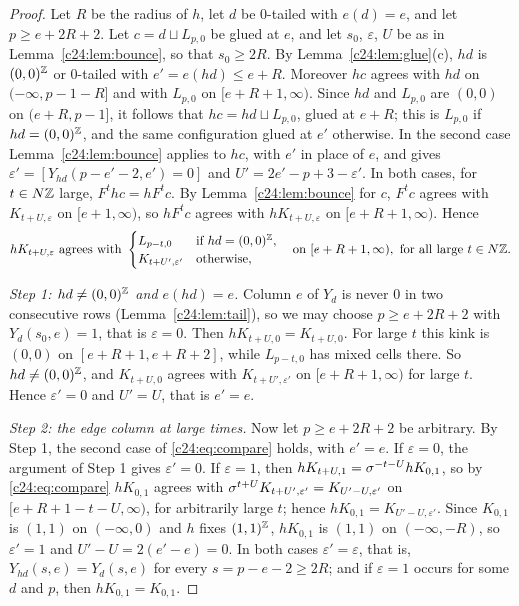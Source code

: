 \begin{proof}
Let $R$ be the radius of $h$, let $d$ be $0$-tailed with $e(d)=e$, and let $p\ge e+2R+2$. Let $c=d\sqcup L_{p,0}$ be glued at $e$, and let $s_0$, $\varepsilon$, $U$ be as in Lemma~\ref{c24:lem:bounce}, so that $s_0\ge 2R$. By Lemma~\ref{c24:lem:glue}(c), $hd$ is $(0,0)^{\mathbb{Z}}$ or $0$-tailed with $e'=e(hd)\le e+R$. Moreover $hc$ agrees with $hd$ on $(-\infty,p-1-R]$ and with $L_{p,0}$ on $[e+R+1,\infty)$. Since $hd$ and $L_{p,0}$ are $(0,0)$ on $(e+R,p-1]$, it follows that $hc=hd\sqcup L_{p,0}$, glued at $e+R$; this is $L_{p,0}$ if $hd=(0,0)^{\mathbb{Z}}$, and the same configuration glued at $e'$ otherwise. In the second case Lemma~\ref{c24:lem:bounce} applies to $hc$, with $e'$ in place of $e$, and gives $\varepsilon'=[Y_{hd}(p-e'-2,e')=0]$ and $U'=2e'-p+3-\varepsilon'$. In both cases, for $t\in N\mathbb{Z}$ large, $F^thc=hF^tc$. By Lemma~\ref{c24:lem:bounce} for $c$, $F^tc$ agrees with $K_{t+U,\varepsilon}$ on $[e+1,\infty)$, so $hF^tc$ agrees with $hK_{t+U,\varepsilon}$ on $[e+R+1,\infty)$. Hence
\begin{equation}\label{c24:eq:compare}
hK_{t+U,\varepsilon}\ \text{agrees with}\ \begin{cases}L_{p-t,0}&\text{if }hd=(0,0)^{\Z},\\ K_{t+U',\varepsilon'}&\text{otherwise,}\end{cases}\quad\text{on }[e+R+1,\infty),\text{ for all large }t\in N\Z.
\end{equation}

\emph{Step 1: $hd\ne(0,0)^{\mathbb{Z}}$ and $e(hd)=e$.} Column $e$ of $Y_d$ is never $0$ in two consecutive rows (Lemma~\ref{c24:lem:tail}), so we may choose $p\ge e+2R+2$ with $Y_d(s_0,e)=1$, that is $\varepsilon=0$. Then $hK_{t+U,0}=K_{t+U,0}$. For large $t$ this kink is $(0,0)$ on $[e+R+1,e+R+2]$, while $L_{p-t,0}$ has mixed cells there. So $hd\ne(0,0)^{\mathbb{Z}}$, and $K_{t+U,0}$ agrees with $K_{t+U',\varepsilon'}$ on $[e+R+1,\infty)$ for large $t$. Hence $\varepsilon'=0$ and $U'=U$, that is $e'=e$.

\emph{Step 2: the edge column at large times.} Now let $p\ge e+2R+2$ be arbitrary. By Step 1, the second case of \eqref{c24:eq:compare} holds, with $e'=e$. If $\varepsilon=0$, the argument of Step 1 gives $\varepsilon'=0$. If $\varepsilon=1$, then $hK_{t+U,1}=\sigma^{-t-U}hK_{0,1}$, so by \eqref{c24:eq:compare} $hK_{0,1}$ agrees with $\sigma^{t+U}K_{t+U',\varepsilon'}=K_{U'-U,\varepsilon'}$ on $[e+R+1-t-U,\infty)$, for arbitrarily large $t$; hence $hK_{0,1}=K_{U'-U,\varepsilon'}$. Since $K_{0,1}$ is $(1,1)$ on $(-\infty,0)$ and $h$ fixes $(1,1)^{\mathbb{Z}}$, $hK_{0,1}$ is $(1,1)$ on $(-\infty,-R)$, so $\varepsilon'=1$ and $U'-U=2(e'-e)=0$. In both cases $\varepsilon'=\varepsilon$, that is, $Y_{hd}(s,e)=Y_d(s,e)$ for every $s=p-e-2\ge2R$; and if $\varepsilon=1$ occurs for some $d$ and $p$, then $hK_{0,1}=K_{0,1}$.


\end{proof}
